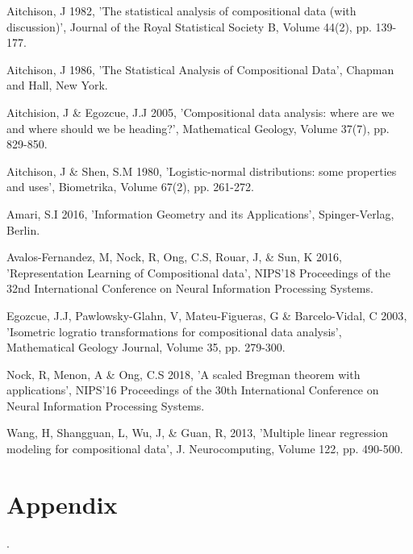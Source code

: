 \documentclass[BSc]{usydthesis}
\numberwithin{equation}{chapter}
\theoremstyle{remark}
\begin{document}
\begin{thebibliography}{0}

{\sc Aitchison, J 1982}, 'The statistical analysis of compositional data (with discussion)', Journal of the Royal Statistical Society B, Volume 44(2), pp. 139-177.

{\sc Aitchison, J 1986}, 'The Statistical Analysis of Compositional Data', Chapman and Hall, New York.

{\sc Aitchision, J \& Egozcue, J.J 2005}, 'Compositional data analysis: where are we and where should we be heading?', Mathematical Geology, Volume 37(7), pp. 829-850.

{\sc Aitchison, J \& Shen, S.M 1980}, 'Logistic-normal distributions: some properties and uses', Biometrika, Volume 67(2), pp. 261-272.

{\sc Amari, S.I 2016}, 'Information Geometry and its Applications', Spinger-Verlag, Berlin.

{\sc Avalos-Fernandez, M, Nock, R, Ong, C.S, Rouar, J, \& Sun, K 2016}, 'Representation Learning of Compositional data', NIPS'18 Proceedings of the 32nd International Conference on Neural Information Processing Systems. 


{\sc Egozcue, J.J, Pawlowsky-Glahn, V, Mateu-Figueras, G \& Barcelo-Vidal, C 2003}, 'Isometric logratio transformations for compositional data analysis', Mathematical Geology Journal, Volume 35, pp. 279-300.

{\sc Nock, R, Menon, A \& Ong, C.S 2018}, 'A scaled Bregman theorem with applications', NIPS'16 Proceedings of the 30th International Conference on Neural Information Processing Systems. 

{\sc Wang, H, Shangguan, L, Wu, J, \& Guan, R, 2013}, 'Multiple linear regression modeling for compositional data', J. Neurocomputing, Volume 122, pp. 490-500.






\end{thebibliography}

\chapter*{Appendix}
.
\end{document}
